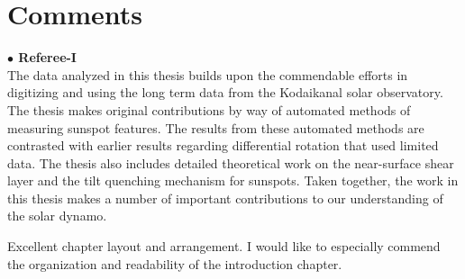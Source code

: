 \documentclass[a4paper, 12pt, twoside]{styles/Thesis}
\begin{document}
\appendix %
% 


\backmatter

\newpage



%  
 
% 
 

\newpage
\thispagestyle{plain}
\section*{Comments}
{\large {\bf $\bullet$ Referee-I}}\\
\headrule
\vspace{-0.5cm}
The data analyzed in this thesis builds upon the commendable efforts in digitizing and using the long term data from the Kodaikanal solar observatory. The thesis makes original contributions by way of automated methods of measuring sunspot features. The results from these automated methods are contrasted with earlier results regarding differential rotation that used limited data. The thesis also includes detailed theoretical work on the near-surface shear layer and the tilt quenching mechanism for sunspots. Taken together, the work in this thesis makes a number of important contributions to our understanding of the solar dynamo.

Excellent chapter layout and arrangement. I would like to especially commend the organization and readability of the introduction chapter.\\[0.5cm]

\end{document}
